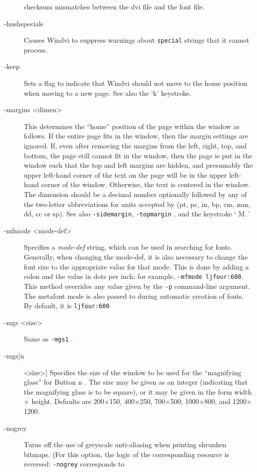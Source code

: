 \documentclass[a4paper,11pt]{article}
\def\WDVI{\textsf{Windvi}}
\begin{document}
\begin{description}
  checksum mismatches between the dvi file and the font file.
\item[-hushspecials] Causes \WDVI{} to suppress warnings about
  \texttt{special} strings that it cannot process.
\item[-keep] Sets a flag to indicate that \WDVI{} should not move to the home
  position when moving to a new page.  See also the `k' keystroke.
\item[-margins <dimen>]  This determines the  ``home'' position of the
  page within the window  as follows.  If the  entire page fits in the
  window, then  the margin   settings are  ignored.  If,   even  after
  removing the margins from the left, right, top, and bottom, the page
  still cannot fit  in the window, then the  page is put in the window
  such that the top  and left margins are  hidden, and presumably  the
  upper left-hand corner of the text on the page  will be in the upper
  left-hand corner of the window.  Otherwise,  the text is centered in
  the   window.  The dimension  should  be a decimal number optionally
  followed  by any of the two-letter  abbreviations for units accepted
  by    (pt, pc,   in,   bp,  cm,  mm,  dd,   cc  or  sp).    See also
  \texttt{-sidemargin}, \texttt{-topmargin} , and the keystroke ` M .'
\item[-mfmode  <mode-def>] Specifies  a \emph{mode-def} string,  which
  can be used in  searching for fonts.   Generally, when changing  the
  mode-def, it  is  also necessary to  change  the  font size  to  the
  appropriate value for that mode.  This is done by adding a colon and
  the  value in  dots  per     inch; for example,      \texttt{-mfmode
    ljfour:600}.    This method  overrides  any   value given by   the
  \texttt{-p} command-line argument.  The metafont mode is also passed
  to \MF{} during  automatic creation  of fonts.   By default, it   is
  \texttt{ljfour:600}
\item[-mgs <size>] Same as \texttt{-mgs1} .
\item[-mgs[n] <size>] Specifies the size of the window to be used for
  the ``magnifying glass'' for Button n . The size may be given as an
  integer (indicating that the magnifying glass is to be square), or
  it may be given in the form width $\times$ height.  Defaults are
  200$\times$150, 400$\times$250, 700$\times$500, 1000$\times$800, and
  1200$\times$1200.
\item[-nogrey] Turns off  the use   of greyscale anti-aliasing    when
  printing shrunken  bitmaps.   (For  this  option, the  logic  of the
  corresponding resource  is reversed: \texttt{-nogrey} corresponds to

\end{description}
\end{document}
